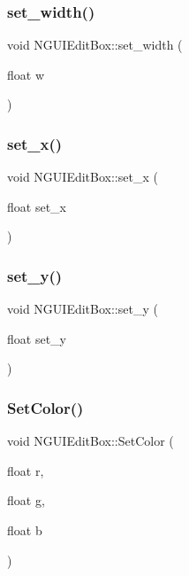 \subsubsection{\texorpdfstring{set\+\_\+width()}{set\_width()}}
{\footnotesize\ttfamily void N\+G\+U\+I\+Edit\+Box\+::set\+\_\+width (\begin{DoxyParamCaption}\item[{float}]{w }\end{DoxyParamCaption})}

\hypertarget{class_n_g_u_i_edit_box_a711047786e5c04acd11f715a61f16003}{}\label{class_n_g_u_i_edit_box_a711047786e5c04acd11f715a61f16003} 
\subsubsection{\texorpdfstring{set\+\_\+x()}{set\_x()}}
{\footnotesize\ttfamily void N\+G\+U\+I\+Edit\+Box\+::set\+\_\+x (\begin{DoxyParamCaption}\item[{float}]{set\+\_\+x }\end{DoxyParamCaption})}

\hypertarget{class_n_g_u_i_edit_box_a774159e97f3125b481d9274b584b9f02}{}\label{class_n_g_u_i_edit_box_a774159e97f3125b481d9274b584b9f02} 
\subsubsection{\texorpdfstring{set\+\_\+y()}{set\_y()}}
{\footnotesize\ttfamily void N\+G\+U\+I\+Edit\+Box\+::set\+\_\+y (\begin{DoxyParamCaption}\item[{float}]{set\+\_\+y }\end{DoxyParamCaption})}

\hypertarget{class_n_g_u_i_edit_box_a097ba0fb443abe1b4bf93a2758f374c7}{}\label{class_n_g_u_i_edit_box_a097ba0fb443abe1b4bf93a2758f374c7} 
\subsubsection{\texorpdfstring{Set\+Color()}{SetColor()}\hspace{0.1cm}{\footnotesize\ttfamily [1/2]}}
{\footnotesize\ttfamily void N\+G\+U\+I\+Edit\+Box\+::\+Set\+Color (\begin{DoxyParamCaption}\item[{float}]{r,  }\item[{float}]{g,  }\item[{float}]{b }\end{DoxyParamCaption})}


